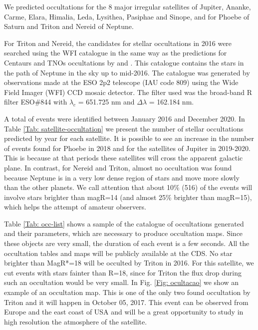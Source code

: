 \documentclass[useAMS,usenatbib]{mn2e}
\begin{document}
We predicted occultations for the 8 major irregular satellites of Jupiter,  Ananke, Carme, Elara, Himalia, Leda, Lysithea, Pasiphae and Sinope, and for Phoebe of Saturn and Triton and Nereid of Neptune.

For Triton and Nereid, the candidates for stellar occultations in 2016 were searched using the WFI catalogue in the same way as the predictions for Centaurs and TNOs occultations by \cite{Assafin2010, Assafin2012} and \cite{Camargo2014}. This catalogue contains the stars in the path of Neptune in the sky up to mid-2016. The catalogue was generated by observations made at the ESO 2p2 telescope (IAU code 809) using the Wide Field Imager (WFI) CCD mosaic detector. The filter used was the broad-band R filter ESO\#844 with $\lambda_c$ = 651.725 nm and $\Delta\lambda$ = 162.184 nm.

A total of \noccs events were identified between January 2016 and December 2020. In Table \ref{Tab: satellite-occultation} we present the number of stellar occultations predicted by year for each satellite. It is possible to see an increase in the number of events found for Phoebe in 2018 and for the satellites of Jupiter in 2019-2020. This is because at that periods these satellites will cross the apparent galactic plane. In contrast, for Nereid and Triton, almost no occultation was found because Neptune is in a very low dense region of stars and move more slowly than the other planets. We call attention that about 10\% (516) of the events will involve stars brighter than magR=14 (and almost 25\% brighter than magR=15), which helps the attempt of amateur observers.

Table \ref{Tab: occ-list} shows a sample of the catalogue of occultations generated and their parameters, which are necessary to produce occultation maps. Since these objects are very small, the duration of each event is a few seconds. All the occultation tables and maps will be publicly available at the CDS. No star brighter than MagR*=18 will be occulted by Triton in 2016. For this satellite, we cut events with stars fainter than R=18, since for Triton the flux drop during such an occultation would be very small. In Fig. \ref{Fig: ocultacao} we show an example of an occultation map. This is one of the only two found occultation by Triton and it will happen in October 05, 2017. This event can be observed from Europe and the east coast of USA and will be a great opportunity to study in high resolution the atmosphere of the satellite.
\end{document}
